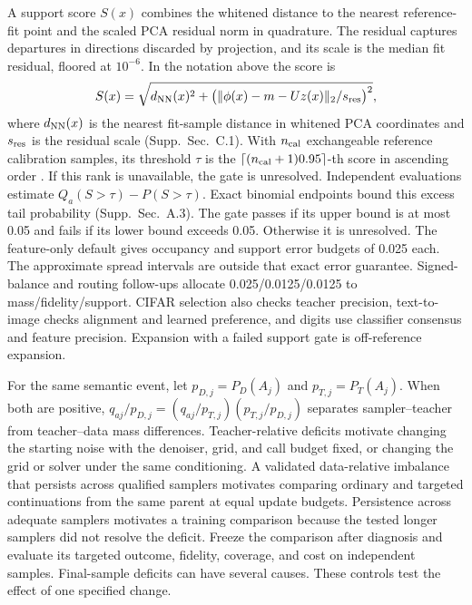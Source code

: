 A support score $S(x)$ combines the whitened distance to the nearest
reference-fit point and the scaled PCA residual norm in quadrature.
The residual captures departures in directions discarded by projection,
and its scale is the median fit residual, floored at $10^{-6}$.
In the notation above the score is
\begin{equation}
S(x)=\sqrt{d_{\rm NN}(x)^2+
\bigl(\|\phi(x)-m-Uz(x)\|_2/s_{\rm res}\bigr)^2},
\label{eq:support}
\end{equation}
where $d_{\rm NN}(x)$ is the nearest fit-sample distance in whitened PCA
coordinates and $s_{\rm res}$ is the residual scale (Supp.~Sec.~C.1). With $n_{\rm cal}$
exchangeable reference calibration samples, its threshold $\tau$ is
the $\lceil(n_{\rm cal}+1)0.95\rceil$-th score in ascending order
\cite{vovk2013conditional}. If this rank is unavailable, the gate is unresolved.
Independent evaluations estimate $Q_a(S>\tau)-P(S>\tau)$.
Exact binomial endpoints bound this excess tail probability (Supp.~Sec.~A.3).
The gate passes if its upper bound is at most 0.05 and fails if its lower
bound exceeds 0.05. Otherwise it is unresolved. The feature-only default
gives occupancy and support error budgets of 0.025 each. The approximate
spread intervals are outside that exact error guarantee. Signed-balance
and routing follow-ups allocate 0.025/0.0125/0.0125 to mass/fidelity/support.
CIFAR selection also checks teacher precision, text-to-image checks alignment
and learned preference, and digits use classifier consensus and feature
precision. Expansion with a failed support gate is off-reference expansion.

For the same semantic event, let $p_{D,j}=P_D(A_j)$ and $p_{T,j}=P_T(A_j)$.
When both are positive, $q_{aj}/p_{D,j}=(q_{aj}/p_{T,j})(p_{T,j}/p_{D,j})$
separates sampler--teacher from teacher--data mass differences.
Teacher-relative deficits motivate changing the starting noise with the
denoiser, grid, and call budget fixed, or changing the grid or solver under
the same conditioning. A validated data-relative imbalance that persists
across qualified samplers motivates comparing ordinary and targeted
continuations from the same parent at equal update budgets. Persistence across adequate
samplers motivates a training comparison because the tested
longer samplers did not resolve the deficit. Freeze the
comparison after diagnosis and evaluate its targeted outcome, fidelity,
coverage, and cost on independent samples. Final-sample deficits can have
several causes. These controls test the effect of one specified change.
